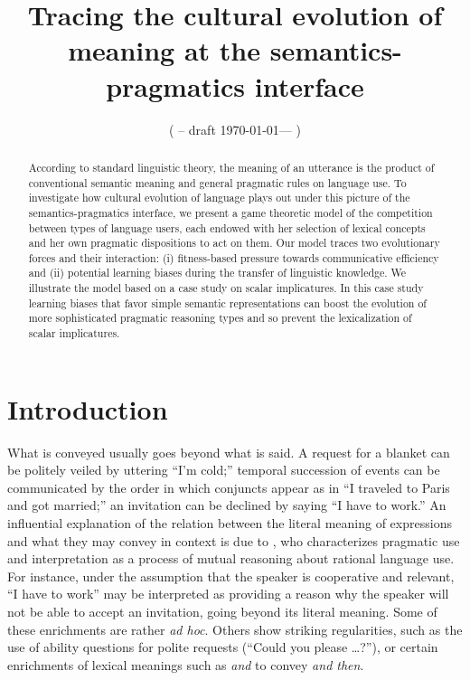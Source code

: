 \documentclass[a4paper, 11pt]{article}
\title{Tracing the cultural evolution of meaning at the semantics-pragmatics interface}
\author{%
    ( -- draft \today --- )
}
\date{}
\begin{document}

\maketitle

\begin{abstract}
  According to standard linguistic theory, the meaning of an utterance is the product of
  conventional semantic meaning and general pragmatic rules on language use. To investigate how
  cultural evolution of language plays out under this picture of the semantics-pragmatics
  interface, we present a game theoretic model of the competition between types of language
  users, each endowed with her selection of lexical concepts and her own pragmatic dispositions
  to act on them. Our model traces two evolutionary forces and their interaction: (i)
  fitness-based pressure towards communicative efficiency and (ii) potential learning biases
  during the transfer of linguistic knowledge. We illustrate the model based on a case study on
  scalar implicatures. In this case study learning biases that favor simple semantic
  representations can boost the evolution of more sophisticated pragmatic reasoning types and
  so prevent the lexicalization of scalar implicatures.
\end{abstract}

\section{Introduction}\label{sec:introduction}
What is conveyed usually goes beyond what is said. A request for a blanket can be politely
veiled by uttering ``I'm cold;'' temporal succession of events can be communicated by the order
in which conjuncts appear as in ``I traveled to Paris and got married;'' an invitation can be
declined by saying ``I have to work.'' An influential explanation of the relation between the
literal meaning of expressions and what they may convey in context is due to
\citet{grice:1975}, who characterizes pragmatic use and interpretation as a process of mutual
reasoning about rational language use. For instance, under the assumption that the speaker is
cooperative and relevant, ``I have to work'' may be interpreted as providing a reason why the
speaker will not be able to accept an invitation, going beyond its literal meaning. Some of
these enrichments are rather \emph{ad hoc}. Others show striking regularities, such as the use
of ability questions for polite requests (``Could you please \dots?''), or certain enrichments
of lexical meanings such as \emph{and} to convey \emph{and then}.
\end{document}
